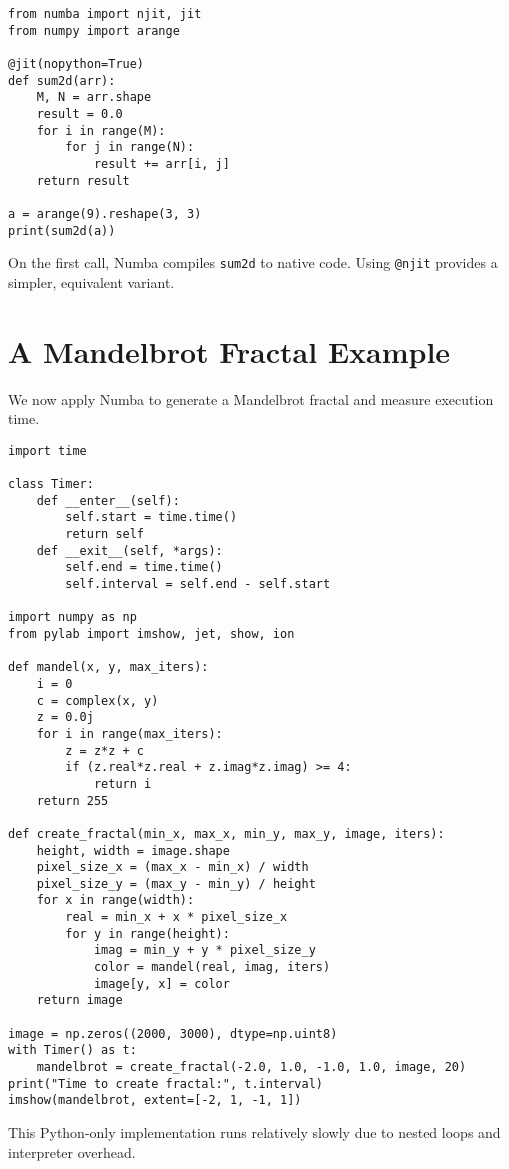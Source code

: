 \documentclass{book}
\begin{document}
\begin{lstlisting}
from numba import njit, jit
from numpy import arange

@jit(nopython=True)
def sum2d(arr):
    M, N = arr.shape
    result = 0.0
    for i in range(M):
        for j in range(N):
            result += arr[i, j]
    return result

a = arange(9).reshape(3, 3)
print(sum2d(a))
\end{lstlisting}

On the first call, Numba compiles \texttt{sum2d} to native code. Using \texttt{@njit} provides a simpler, equivalent variant.

\section{A Mandelbrot Fractal Example}
We now apply Numba to generate a Mandelbrot fractal and measure execution time.

\begin{lstlisting}
import time

class Timer:
    def __enter__(self):
        self.start = time.time()
        return self
    def __exit__(self, *args):
        self.end = time.time()
        self.interval = self.end - self.start

import numpy as np
from pylab import imshow, jet, show, ion

def mandel(x, y, max_iters):
    i = 0
    c = complex(x, y)
    z = 0.0j
    for i in range(max_iters):
        z = z*z + c
        if (z.real*z.real + z.imag*z.imag) >= 4:
            return i
    return 255

def create_fractal(min_x, max_x, min_y, max_y, image, iters):
    height, width = image.shape
    pixel_size_x = (max_x - min_x) / width
    pixel_size_y = (max_y - min_y) / height
    for x in range(width):
        real = min_x + x * pixel_size_x
        for y in range(height):
            imag = min_y + y * pixel_size_y
            color = mandel(real, imag, iters)
            image[y, x] = color
    return image

image = np.zeros((2000, 3000), dtype=np.uint8)
with Timer() as t:
    mandelbrot = create_fractal(-2.0, 1.0, -1.0, 1.0, image, 20)
print("Time to create fractal:", t.interval)
imshow(mandelbrot, extent=[-2, 1, -1, 1])
\end{lstlisting}

This Python-only implementation runs relatively slowly due to nested loops and interpreter overhead.
\end{document}
